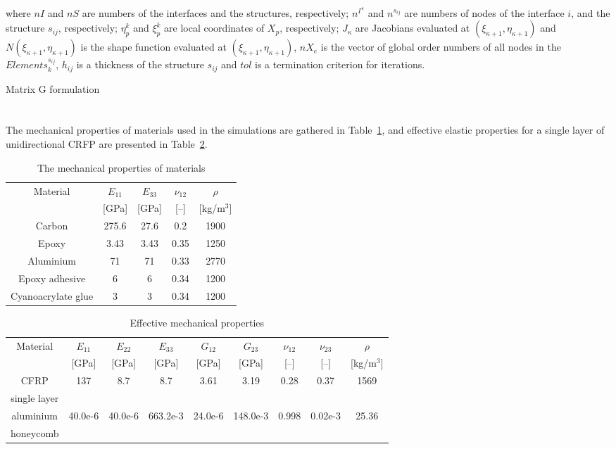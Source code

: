 \documentclass[sensors,article,submit,moreauthors,pdftex]{Definitions/mdpi}
\begin{document}
\begin{algorithm}[H]
{{		}
	}
	where \(nI\) and \(nS\) are numbers of the interfaces and the structures, respectively; \(n^{\Gamma^i}\) and \(n^{s_{ij}}\) are numbers of nodes of the interface \(i\), and the structure \(s_{ij}\), respectively; \(\eta^k_p\) and  \(\xi^k_p\) are local coordinates of \(X_p\), respectively; \(J_{\kappa}\) are Jacobians evaluated at \((\xi_{\kappa+1},\eta_{\kappa+1})\) and \(N(\xi_{\kappa+1},\eta_{\kappa+1})\) is the shape function evaluated at \((\xi_{\kappa+1},\eta_{\kappa+1})\), \(nX_e\) is the vector of global order numbers of all nodes in the \(Elements^{s_{ij}}_k\), \(h_{ij}\) is a thickness of the structure \(s_{ij}\) and \(tol\) is a termination criterion for iterations.
	\caption{Matrix G formulation}
	\label{alg:G_matrix}
\end{algorithm}
\section{}
\label{app:properties}
The mechanical properties of materials used in the simulations are gathered in Table~\ref{tab:properties}, and effective elastic properties for a single layer of unidirectional CRFP are presented in Table~\ref{tab:properties_eff}.
\begin{table}
	\centering
	\caption{\label{tab:properties}The mechanical properties of materials}
	\begin{tabular}{ccccc}\hline
		Material & \(E_{11}\) &  \(E_{33}\) & \(\nu_{12}\) & \(\rho\) \\
		& [GPa] &  [GPa] & [--] & [kg/m\(^3\)]\\
		\hline
		Carbon & 275.6 & 27.6 & 0.2 & 1900\\
		Epoxy & 3.43 & 3.43 & 0.35 & 1250\\
		Aluminium & 71 & 71 & 0.33 & 2770\\
		Epoxy adhesive & 6 & 6 & 0.34 & 1200\\
		Cyanoacrylate glue & 3 & 3 & 0.34 & 1200		
	\end{tabular}
\end{table}

\begin{table}
	\centering
	\caption{\label{tab:properties_eff} Effective mechanical properties}
	\begin{tabular}{ccccccccc}
		\hline
		Material & \(E_{11}\) & \(E_{22}\) & \(E_{33}\) & \(G_{12}\) & \(G_{23}\) & \(\nu_{12}\) 
		& \(\nu_{23}\) & \(\rho\) \\
		& \([\)GPa] & [GPa] & [GPa] & [GPa] & [GPa] & [--] & [--] & [kg/m\(^3\)]\\
		\hline
		CFRP & 137 & 8.7 & 8.7 & 3.61 & 3.19 & 0.28 & 0.37 & 1569\\
		single layer & & & & & & & &\\ \hline
		aluminium & 40.0e-6 & 40.0e-6 & 663.2e-3 & 24.0e-6 & 148.0e-3 & 0.998 & 0.02e-3 & 25.36\\
		honeycomb & & & & & & & &\\
		\hline
	\end{tabular}
\end{table}
\end{document}
